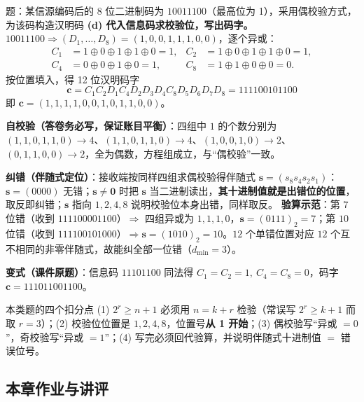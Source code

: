 \begin{example}{题：某信源编码后的 8 位二进制码为 $10011100$（最高位为 1），采用偶校验方式，为该码构造汉明码}
\medskip
\textbf{(d) 代入信息码求校验位，写出码字。}$10011100\Rightarrow(D_1,\dots,D_8)=(1,0,0,1,1,1,0,0)$，逐个异或：
\begin{align*}
C_1&=1\oplus0\oplus1\oplus1\oplus0=1, &
C_2&=1\oplus0\oplus1\oplus1\oplus0=1,\\
C_4&=0\oplus0\oplus1\oplus0=1, &
C_8&=1\oplus1\oplus0\oplus0=0 .
\end{align*}
按位置填入，得 12 位汉明码字
\begin{equation*}
\boxed{\ \mathbf{c}=C_1C_2D_1C_4D_2D_3D_4C_8D_5D_6D_7D_8=111100101100\ }
\end{equation*}
即 $\mathbf{c}=(1,1,1,1,0,0,1,0,1,1,0,0)$。

\medskip
\textbf{自校验（答卷务必写，保证账目平衡）}：四组中 $1$ 的个数分别为
$(1,1,0,1,1,0)\to4$、$(1,1,0,1,1,0)\to4$、$(1,0,0,1,0)\to2$、$(0,1,1,0,0)\to2$，全为偶数，方程组成立，与“偶校验”一致。

\medskip
\textbf{纠错（伴随式定位）}：接收端按同样四组求偶校验得伴随式 $\mathbf{s}=(s_8s_4s_2s_1)$：$\mathbf{s}=(0000)$ 无错；$\mathbf{s}\ne\mathbf{0}$ 时把 $\mathbf{s}$ 当二进制读出，\textbf{其十进制值就是出错位的位置}，取反即纠错；$\mathbf{s}$ 指向 $1,2,4,8$ 说明校验位本身出错，同样取反。
\textbf{验算示范}：第 $7$ 位错（收到 $111100001100$）$\Rightarrow$ 四组异或为 $1,1,1,0$，$\mathbf{s}=(0111)_2=7$；第 $10$ 位错（收到 $111100101000$）$\Rightarrow\mathbf{s}=(1010)_2=10$。$12$ 个单错位置对应 $12$ 个互不相同的非零伴随式，故能纠全部一位错（$d_{\min}=3$）。

\medskip
\textbf{变式（课件原题）}：信息码 $11101100$ 同法得 $C_1=C_2=1,\ C_4=C_8=0$，码字 $\mathbf{c}=111011001100$。
\end{example}

\begin{warning}{本类题的四个扣分点}
(1) $2^r\ge n+1$ 必须用 $n=k+r$ 检验（常误写 $2^r\ge k+1$ 而取 $r=3$）；(2) 校验位位置是 $1,2,4,8$，位置号\textbf{从 1 开始}；(3) 偶校验写“异或 $=0$”，奇校验写“异或 $=1$”；(4) 写完必须回代验算，并说明伴随式十进制值 $=$ 错误位号。
\end{warning}

\subsection{本章作业与讲评}

